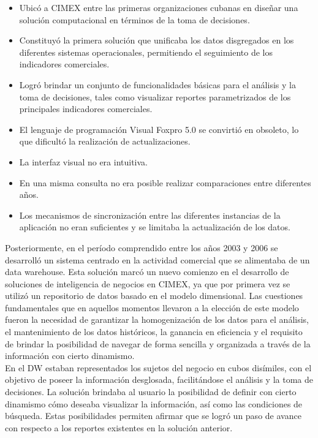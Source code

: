 \begin{itemize}
\item Ubicó a CIMEX entre las primeras organizaciones cubanas en diseñar una solución computacional en términos de la toma de decisiones. 
\item Constituyó la primera solución que unificaba los datos disgregados en los diferentes sistemas operacionales, permitiendo el seguimiento de los indicadores comerciales.
\item Logró brindar un conjunto de funcionalidades básicas para el análisis y la toma de decisiones, tales como visualizar reportes parametrizados de los principales indicadores comerciales.
\item El lenguaje de programación Visual Foxpro 5.0 se convirtió en obsoleto, lo que dificultó la realización de actualizaciones.
\item La interfaz visual no era intuitiva.  
\item En una misma consulta no era posible realizar comparaciones entre diferentes años. 
\item Los mecanismos de sincronización entre las diferentes instancias de la aplicación no eran suficientes y se limitaba la actualización de los datos.
\end{itemize}

Posteriormente, en el período comprendido entre los años 2003 y 2006 se desarrolló un sistema centrado en la actividad comercial que se alimentaba de un data warehouse. Esta solución marcó un nuevo comienzo en el desarrollo de soluciones de inteligencia de negocios en CIMEX, ya que por primera vez se utilizó un repositorio de datos basado en el modelo dimensional. Las cuestiones fundamentales que en aquellos momentos llevaron a la elección de este modelo fueron la necesidad de garantizar la homogenización de los datos para el análisis, el mantenimiento de los datos históricos, la ganancia en eficiencia y el requisito de brindar la posibilidad de navegar de forma sencilla y organizada a través de la información con cierto dinamismo. \\

En el DW estaban representados los sujetos del negocio en cubos disímiles, con el objetivo de poseer la información desglosada, facilitándose el análisis y la toma de decisiones. La solución brindaba al usuario la posibilidad de definir con cierto dinamismo cómo deseaba visualizar la información, así como las condiciones de búsqueda. Estas posibilidades permiten afirmar que se logró un paso de avance con respecto a los reportes existentes en la solución anterior. \\

